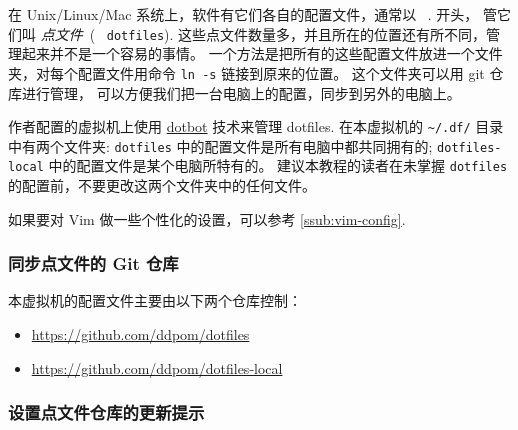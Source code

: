 \documentclass[
    11pt,
    cite=authoryear,
    device=normal,
    lang=cn,
    mode=simple,
    result=answer,
    toc=onecol,
]{elegantbook_sierxue}
\begin{document}
在 Unix/Linux/Mac 系统上，软件有它们各自的配置文件，通常以 ~.  开头，
管它们叫 \emph{点文件}~(~ \texttt{dotfiles}).
这些点文件数量多，并且所在的位置还有所不同，管理起来并不是一个容易的事情。
一个方法是把所有的这些配置文件放进一个文件夹，对每个配置文件用命令
\lstinline{ln -s} 链接到原来的位置。
这个文件夹可以用 git 仓库进行管理，
可以方便我们把一台电脑上的配置，同步到另外的电脑上。

作者配置的虚拟机上使用
\href{https://github.com/anishathalye/dotbot}{dotbot} 技术来管理 dotfiles.
在本虚拟机的 \lstinline{~/.df/} 目录中有两个文件夹: \lstinline{dotfiles}
中的配置文件是所有电脑中都共同拥有的; \lstinline{dotfiles-local}
中的配置文件是某个电脑所特有的。
建议本教程的读者在未掌握 \lstinline{dotfiles}
的配置前，不要更改这两个文件夹中的任何文件。
\begin{tip}\label{note:vim-customized}
    如果要对 Vim 做一些个性化的设置，可以参考 \ref{ssub:vim-config}.
\end{tip}


\subsubsection{同步点文件的 Git 仓库}%
\label{ssub:vbox-guest-ganx-conf}

本虚拟机的配置文件主要由以下两个仓库控制：
\begin{itemize}
    \item \href{https://github.com/ddpom/dotfiles}
        {https://github.com/ddpom/dotfiles}
    \item \href{https://github.com/ddpom/dotfiles-local}
        {https://github.com/ddpom/dotfiles-local}
\end{itemize}

\subsubsection{设置点文件仓库的更新提示}%
\label{ssub:vbox-guest-ganx-conf-update-notification}
\end{document}
